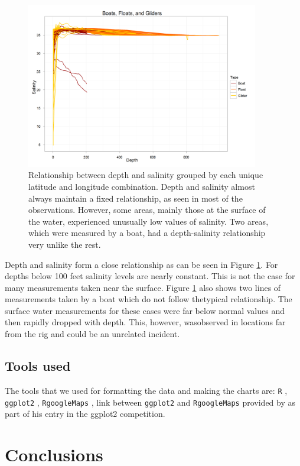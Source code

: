 \documentclass[authoryear,12pt]{elsarticle}
\begin{document}
\begin{figure}[htbp] %
   \centering
   \includegraphics[width=4in]{deapth-salinity.png} 
   \caption{Relationship between depth and salinity grouped by each unique latitude and longitude combination. Depth and salinity almost always maintain a fixed relationship, as seen in most of the observations. However, some areas, mainly those at the surface of the water, experienced unusually low values of salinity. Two areas, which were measured by a boat, had a depth-salinity relationship very unlike the rest.}
   \label{Depth-Salinity}
\end{figure}
Depth and salinity form a close relationship as can be seen in Figure \ref{Depth-Salinity}. For depths below 100 feet salinity levels are nearly constant. This is not the case for many measurements taken near the surface. Figure \ref{Depth-Salinity}  also shows  two lines of measurements taken by a boat which do not follow the{typical} relationship. The surface water measurement{s for these cases were} far below normal {values} and {then rapidly} dropped  with depth. This, however, was{observed} in locations far from the rig and {could be an} unrelated incident.

\subsection{Tools used}
The tools that we used for formatting the data and making the charts are:
{\tt R} \citep{R2011}, {\tt ggplot2} \citep{ggplot2}, {\tt RgoogleMaps} \citep{RgoogleMaps}, link between {\tt ggplot2} and {\tt RgoogleMaps} provided by \citet{kahle2010} as part of his entry in the ggplot2 competition.



\section{Conclusions}
\end{document}
